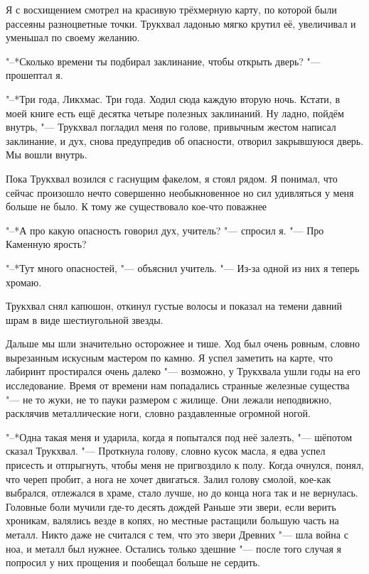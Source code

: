 Я с восхищением смотрел на красивую трёхмерную карту, по которой были рассеяны разноцветные точки.
Трукхвал ладонью мягко крутил её, увеличивал и уменьшал по своему желанию.

"--*Сколько времени ты подбирал заклинание, чтобы открыть дверь? "--- прошептал я.

"--*Три года, Ликхмас.
Три года.
Ходил сюда каждую вторую ночь.
Кстати, в моей книге есть ещё десятка четыре полезных заклинаний.
Ну ладно, пойдём внутрь, "--- Трукхвал погладил меня по голове, привычным жестом написал заклинание, и дух, снова предупредив об опасности, отворил закрывшуюся дверь.
Мы вошли внутрь.

Пока Трукхвал возился с гаснущим факелом, я стоял рядом.
Я понимал, что сейчас произошло нечто совершенно необыкновенное но сил удивляться у меня больше не было.
К тому же существовало кое-что поважнее\ldotst

"--*А про какую опасность говорил дух, учитель? "--- спросил я.
"--- Про Каменную ярость?

"--*Тут много опасностей, "--- объяснил учитель.
"--- Из-за одной из них я теперь хромаю.

Трукхвал снял капюшон, откинул густые волосы и показал на темени давний шрам в виде шестиугольной звезды.

\razd

Дальше мы шли значительно осторожнее и тише.
Ход был очень ровным, словно вырезанным искусным мастером по камню.
Я успел заметить на карте, что лабиринт простирался очень далеко "--- возможно, у Трукхвала ушли годы на его исследование.
Время от времени нам попадались странные железные существа "--- не то жуки, не то пауки размером с жилище.
Они лежали неподвижно, расклячив металлические ноги, словно раздавленные огромной ногой.

"--*Одна такая меня и ударила, когда я попытался под неё залезть, "--- шёпотом сказал Трукхвал.
"--- Проткнула голову, словно кусок масла, я едва успел присесть и отпрыгнуть, чтобы меня не пригвоздило к полу.
Когда очнулся, понял, что череп пробит, а нога не хочет двигаться.
Залил голову смолой, кое-как выбрался, отлежался в храме, стало лучше, но до конца нога так и не вернулась.
Головные боли мучили где-то десять дождей\ldotst
Раньше эти звери, если верить хроникам, валялись везде в копях, но местные растащили большую часть на металл.
Никто даже не считался с тем, что это звери Древних "--- шла война с ноа, и металл был нужнее.
Остались только здешние "--- после того случая я попросил у них прощения и пообещал больше не сердить.

